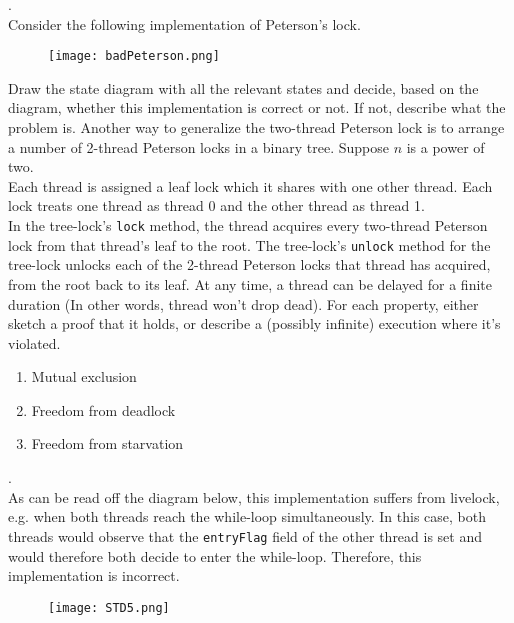 \documentclass[main]{subfiles}
\begin{document}
\begin{ExerciseList}
        
        \Exercise[title={Peterson's},label=IP].\quad \\
            \Question Consider the following implementation of Peterson's lock.
                \begin{figure}[H]
                    \centering
                    \texttt{[image: badPeterson.png]}
                \end{figure}
                Draw the state diagram with all the relevant states and decide, based on the diagram, whether this implementation is correct or not. If not, describe what the problem is.
            \Question Another way to generalize the two-thread Peterson lock is to arrange a number of 2-thread Peterson locks in a binary tree. Suppose $n$ is a power of two.\\[3mm]
                Each thread is assigned a leaf lock which it shares with one other thread. Each lock treats one thread as thread 0 and the other thread as thread 1.\\[3mm]
                In the tree-lock's \texttt{lock} method, the thread acquires every two-thread Peterson lock from that thread's leaf to the root. The tree-lock's \texttt{unlock} method for the tree-lock unlocks each of the 2-thread Peterson locks that thread has acquired, from the root back to its leaf. At any time, a thread can be delayed for a finite duration (In other words, thread won't drop dead). For each property, either sketch a proof that it holds, or describe a (possibly infinite) execution where it's violated.
                \begin{enumerate}
                    \item Mutual exclusion
                    \item Freedom from deadlock
                    \item Freedom from starvation
                \end{enumerate}
        \Answer[ref={IP}].\quad \\
            \Question As can be read off the diagram below, this implementation suffers from livelock, e.g. when both threads reach the while-loop simultaneously. In this case, both threads would observe that the \texttt{entryFlag} field of the other thread is set and would therefore both decide to enter the while-loop. Therefore, this implementation is incorrect.
            \begin{figure}[H]
                \centering
                \texttt{[image: STD5.png]}
            \end{figure}

\end{ExerciseList}
\end{document}
